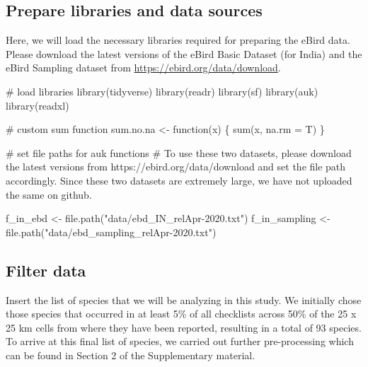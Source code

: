\documentclass[]{article}
\newenvironment{Shaded}{}{}
\newcommand{\CommentTok}[1]{\textcolor[rgb]{0.00,0.50,0.00}{#1}}
\newcommand{\ControlFlowTok}[1]{\textcolor[rgb]{0.00,0.00,1.00}{#1}}
\newcommand{\DataTypeTok}[1]{#1}
\newcommand{\KeywordTok}[1]{\textcolor[rgb]{0.00,0.00,1.00}{#1}}
\newcommand{\NormalTok}[1]{#1}
\newcommand{\StringTok}[1]{\textcolor[rgb]{0.00,0.50,0.50}{#1}}
\begin{document}
\hypertarget{prepare-libraries-and-data-sources}{%
\subsection{Prepare libraries and data sources}\label{prepare-libraries-and-data-sources}}

Here, we will load the necessary libraries required for preparing the eBird data. Please download the latest versions of the eBird Basic Dataset (for India) and the eBird Sampling dataset from \url{https://ebird.org/data/download}.

\begin{Shaded}
\begin{Highlighting}[numbers=left,,]
\CommentTok{# load libraries}
\KeywordTok{library}\NormalTok{(tidyverse)}
\KeywordTok{library}\NormalTok{(readr)}
\KeywordTok{library}\NormalTok{(sf)}
\KeywordTok{library}\NormalTok{(auk)}
\KeywordTok{library}\NormalTok{(readxl)}

\CommentTok{# custom sum function}
\NormalTok{sum.no.na <-}\StringTok{ }\ControlFlowTok{function}\NormalTok{(x) \{}
  \KeywordTok{sum}\NormalTok{(x, }\DataTypeTok{na.rm =}\NormalTok{ T)}
\NormalTok{\}}

\CommentTok{# set file paths for auk functions}
\CommentTok{# To use these two datasets, please download the latest versions from https://ebird.org/data/download and set the file path accordingly. Since these two datasets are extremely large, we have not uploaded the same on github.}

\NormalTok{f_in_ebd <-}\StringTok{ }\KeywordTok{file.path}\NormalTok{(}\StringTok{"data/ebd_IN_relApr-2020.txt"}\NormalTok{)}
\NormalTok{f_in_sampling <-}\StringTok{ }\KeywordTok{file.path}\NormalTok{(}\StringTok{"data/ebd_sampling_relApr-2020.txt"}\NormalTok{)}
\end{Highlighting}
\end{Shaded}

\hypertarget{filter-data}{%
\subsection{Filter data}\label{filter-data}}

Insert the list of species that we will be analyzing in this study. We initially chose those species that occurred in at least 5\% of all checklists across 50\% of the 25 x 25 km cells from where they have been reported, resulting in a total of 93 species. To arrive at this final list of species, we carried out further pre-processing which can be found in Section 2 of the Supplementary material.
\end{document}
